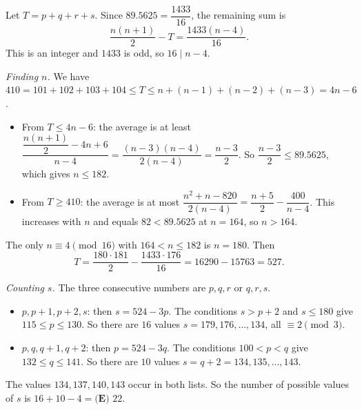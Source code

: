 Let $T=p+q+r+s$. Since $89.5625=\dfrac{1433}{16}$, the remaining sum is
\[\dfrac{n(n+1)}2-T=\dfrac{1433(n-4)}{16}.\]
This is an integer and $1433$ is odd, so $16\mid n-4$.

\emph{Finding $n$.} We have $410=101+102+103+104\le T\le n+(n-1)+(n-2)+(n-3)=4n-6$.
\begin{itemize}
\item From $T\le4n-6$: the average is at least $\dfrac{\dfrac{n(n+1)}2-4n+6}{n-4}=\dfrac{(n-3)(n-4)}{2(n-4)}=\dfrac{n-3}2$. So $\dfrac{n-3}2\le89.5625$, which gives $n\le182$.
\item From $T\ge410$: the average is at most $\dfrac{n^2+n-820}{2(n-4)}=\dfrac{n+5}2-\dfrac{400}{n-4}$. This increases with $n$ and equals $82<89.5625$ at $n=164$, so $n>164$.
\end{itemize}
The only $n\equiv4\pmod{16}$ with $164<n\le182$ is $n=180$. Then
\[T=\dfrac{180\cdot181}2-\dfrac{1433\cdot176}{16}=16290-15763=527.\]

\emph{Counting $s$.} The three consecutive numbers are $p,q,r$ or $q,r,s$.
\begin{itemize}
\item $p,p+1,p+2,s$: then $s=524-3p$. The conditions $s>p+2$ and $s\le180$ give $115\le p\le130$. So there are $16$ values $s=179,176,\dots,134$, all $\equiv2\pmod3$.
\item $p,q,q+1,q+2$: then $p=524-3q$. The conditions $100<p<q$ give $132\le q\le141$. So there are $10$ values $s=q+2=134,135,\dots,143$.
\end{itemize}
The values $134,137,140,143$ occur in both lists. So the number of possible values of $s$ is $16+10-4=\boxed{\textbf{(E) }22}$.
